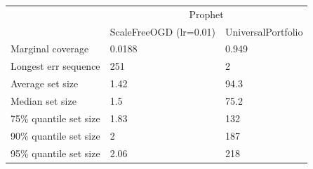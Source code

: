 \begin{tabular}{lll}
\toprule
& \multicolumn{2}{c}{Prophet} \\
& ScaleFreeOGD (lr=0.01) & UniversalPortfolio \\
\midrule
Marginal coverage & 0.0188 & 0.949 \\
Longest err sequence & 251 & 2 \\
Average set size & 1.42 & 94.3 \\
Median set size & 1.5 & 75.2 \\
75\% quantile set size & 1.83 & 132 \\
90\% quantile set size & 2 & 187 \\
95\% quantile set size & 2.06 & 218 \\
\bottomrule
\end{tabular}

